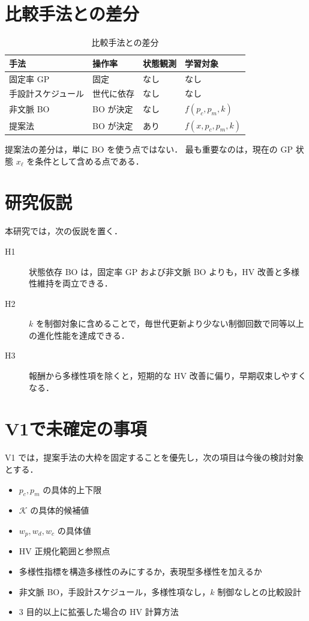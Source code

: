 \documentclass[a4paper,11pt]{ltjsarticle}
\begin{document}
\section{比較手法との差分}

\begin{table}[htbp]
\centering
\caption{比較手法との差分}
\begin{tabular}{llll}
\toprule
手法 & 操作率 & 状態観測 & 学習対象 \\
\midrule
固定率 GP & 固定 & なし & なし \\
手設計スケジュール & 世代に依存 & なし & なし \\
非文脈 BO & BO が決定 & なし & \(f(p_c,p_m,k)\) \\
提案法 & BO が決定 & あり & \(f(x,p_c,p_m,k)\) \\
\bottomrule
\end{tabular}
\end{table}

提案法の差分は，単に BO を使う点ではない．
最も重要なのは，現在の GP 状態 \(x_\ell\) を条件として含める点である．

\section{研究仮説}

本研究では，次の仮説を置く．

\begin{description}
  \item[H1] 状態依存 BO は，固定率 GP および非文脈 BO よりも，HV 改善と多様性維持を両立できる．
  \item[H2] \(k\) を制御対象に含めることで，毎世代更新より少ない制御回数で同等以上の進化性能を達成できる．
  \item[H3] 報酬から多様性項を除くと，短期的な HV 改善に偏り，早期収束しやすくなる．
\end{description}

\section{V1で未確定の事項}

V1 では，提案手法の大枠を固定することを優先し，次の項目は今後の検討対象とする．

\begin{itemize}
  \item \(p_c,p_m\) の具体的上下限
  \item \(\mathcal{K}\) の具体的候補値
  \item \(w_p,w_d,w_c\) の具体値
  \item HV 正規化範囲と参照点
  \item 多様性指標を構造多様性のみにするか，表現型多様性を加えるか
  \item 非文脈 BO，手設計スケジュール，多様性項なし，\(k\) 制御なしとの比較設計
  \item 3 目的以上に拡張した場合の HV 計算方法
\end{itemize}
\end{document}

